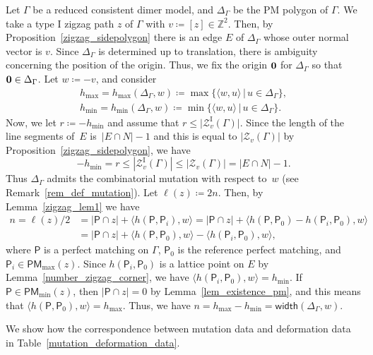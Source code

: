 \documentclass[11pt]{article}
\numberwithin{equation}{section}
\numberwithin{equation}{section}
\numberwithin{figure}{section}
\numberwithin{table}{section}
\newcommand{\ZZ}{\mathbb{Z}}
\newcommand{\rmI}{\mathrm{I}}
\newcommand{\calZ}{\mathcal{Z}}
\newcommand{\sfP}{\mathsf{P}}
\newcommand{\PM}{\mathsf{PM}}
\newcommand{\width}{\mathsf{width}}
\begin{document}
\begin{setting}
\label{mutation_deformation_setting}
Let $\Gamma$ be a reduced consistent dimer model, and $\Delta_\Gamma$ be the PM polygon of $\Gamma$.
We take a type I zigzag path $z$ of $\Gamma$ with $v\coloneqq [z]\in\ZZ^2$. Then, by Proposition~\ref{zigzag_sidepolygon}
there is an edge $E$ of $\Delta_\Gamma$ whose outer normal vector is $v$.
Since $\Delta_\Gamma$ is determined up to translation, there is ambiguity concerning the position of the origin.
Thus, we fix the origin ${\bf 0}$ for $\Delta_\Gamma$ so that ${\bf 0}\in\Delta_\Gamma$.
Let $w\coloneqq -v$, and consider
\begin{gather*}
h_{\max}= h_{\max}(\Delta_\Gamma,w)\coloneqq{\max}\{\langle w,u\rangle \,|\, u\in \Delta_\Gamma\},
\\
h_{\min}= h_{\min}(\Delta_\Gamma,w)\coloneqq{\min}\{\langle w,u\rangle \,|\, u\in \Delta_\Gamma\}.
\end{gather*}
Now, we let $r\coloneqq-h_{\min}$ and assume that $r\le\big|\calZ_v^\rmI(\Gamma)\big|$.
Since the length of the line segments of~$E$ is~$|E\cap N|-1$ and this is equal to $|\calZ_v(\Gamma)|$ by Proposition~\ref{zigzag_sidepolygon}, we have
\begin{displaymath}
-h_{\min}=r\le|\calZ_v^\rmI(\Gamma)|\le|\calZ_v(\Gamma)|=|E\cap N|-1.
\end{displaymath}
Thus $\Delta_\Gamma$ admits the combinatorial mutation with respect to~$w$ (see Remark~\ref{rem_def_mutation}).
Let $\ell(z)\coloneqq2n$. Then, by Lemma~\ref{zigzag_lem1} we have
\begin{align*}
n=\ell(z)/2&=|\sfP\cap z|+\langle h(\sfP,\sfP_i),w\rangle =|\sfP\cap z|+\langle h(\sfP,\sfP_0)-h(\sfP_i,\sfP_0),w\rangle\\
&=|\sfP\cap z|+\langle h(\sfP,\sfP_0),w\rangle-\langle h(\sfP_i,\sfP_0),w\rangle,
\end{align*}
where $\sfP$ is a perfect matching on $\Gamma$, $\sfP_0$ is the reference perfect matching, and $\sfP_i\in\PM_{\max}(z)$.
Since $h(\sfP_i,\sfP_0)$ is a lattice point on $E$ by Lemma~\ref{number_zigzag_corner}, we have $\langle h(\sfP_i,\sfP_0),w\rangle=h_{\min}$.
If $\sfP\in\PM_{\min}(z)$, then $|\sfP\cap z|=0$ by Lemma~\ref{lem_existence_pm}, and this means that $\langle h(\sfP,\sfP_0),w\rangle=h_{\max}$.
Thus, we have $n=h_{\max}-h_{\min}=\width(\Delta_\Gamma,w)$.


We show how the correspondence between mutation data and deformation data in Table~\ref{mutation_deformation_data}.


\end{setting}
\end{document}
